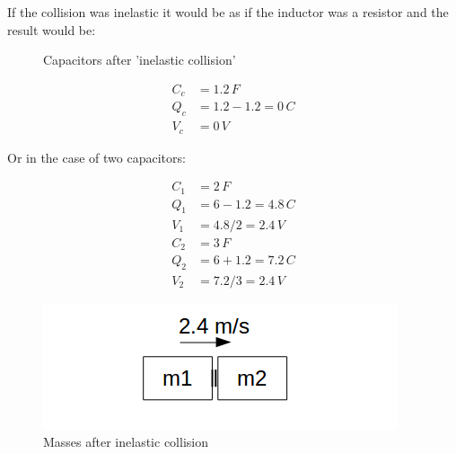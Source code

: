 \documentclass[]{elementary-physics}
\begin{document}
If the collision was inelastic it would be as if the inductor was a resistor and the result would be:

\begin{figure}[ht] \centering
	\qquad
	\caption{Capacitors after 'inelastic collision'}
\end{figure}

\begin{subequations}
\begin{align}
C_c &= 1.2 \, F \\
Q_c &= 1.2 - 1.2 = 0 \, C \\
V_c &= 0 \, V
\end{align}
\end{subequations}

Or in the case of two capacitors:

\begin{subequations}
\begin{align}
C_1 &= 2 \, F \\
Q_1 &= 6 - 1.2 = 4.8 \, C \\
V_1 &= 4.8 / 2 = 2.4 \, V \\
C_2 &= 3 \, F \\
Q_2 &= 6 + 1.2 = 7.2 \, C \\
V_2 &= 7.2 / 3 = 2.4 \, V
\end{align}
\end{subequations}

\begin{figure}[ht] \centering
	\includegraphics[scale=.5]{mms2} \caption{Masses after inelastic collision}
\end{figure}
\end{document}
